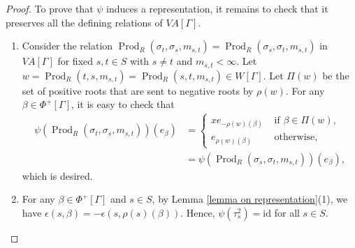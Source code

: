\documentclass[12pt]{amsart}
\numberwithin{equation}{section}
\newcommand{\id}{\mathrm{id}}
\begin{document}
\begin{proof}
To prove that  $\psi$ induces a representation, it remains to check that it preserves all the defining relations of $VA[\Gamma]$.
 \begin{enumerate}
 \item Consider the relation $\operatorname{Prod}_R\left(\sigma_t, \sigma_s, m_{s, t}\right)=\operatorname{Prod}_R\left(\sigma_s, \sigma_t, m_{s, t}\right)$ in $VA[\Gamma]$ for fixed $s, t \in S$ with $s \neq t$ and $m_{s, t} < \infty$.  Let $w=\operatorname{Prod}_R\left(t, s, m_{s, t}\right)=\operatorname{Prod}_R\left(s,t, m_{s, t}\right) \in W[\Gamma]$. Let $\Pi(w)$ be the set of positive roots that are sent to negative roots by $\rho(w)$. For any $\beta \in \Phi^{+}[\Gamma]$, it is easy to check that 
\begin{align*}
\psi(\operatorname{Prod}_R\left(\sigma_t, \sigma_s, m_{s, t}\right))\left(e_\beta\right)&= \begin{cases}
x e_{-\rho(w)(\beta)}  & \text{ if } \beta\in \Pi(w), \\ 
e_{\rho(w)(\beta)} & \text{ otherwise,} 
 \end{cases}\\
 &=\psi(\operatorname{Prod}_R\left(\sigma_s, \sigma_t, m_{s, t}\right))\left(e_\beta\right),
\end{align*}
which is desired.
\item For any $\beta \in \Phi^{+}[\Gamma]$ and $s \in S$, by Lemma \ref{lemma on representation}(1), we have $\epsilon(s,\beta)=-\epsilon (s, \rho(s)(\beta))$. Hence, $\psi(\tau_s^2) = \id$ for all $s \in S$.


\end{enumerate}
\end{proof}
\end{document}
